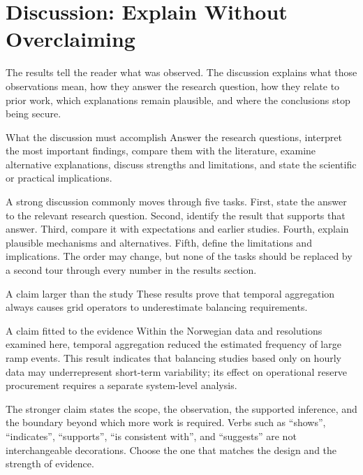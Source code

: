 \documentclass[masters,en,listoffigures,listoftables,acronyms]{NMBU}
\begin{document}
\clearpage
\section{Discussion: Explain Without Overclaiming}
\label{sec:discussion}

The results tell the reader what was observed. The discussion explains what
those observations mean, how they answer the research question, how they relate
to prior work, which explanations remain plausible, and where the conclusions
stop being secure.

\begin{thesispoint}{What the discussion must accomplish}
Answer the research questions, interpret the most important findings, compare
them with the literature, examine alternative explanations, discuss strengths
and limitations, and state the scientific or practical implications.
\end{thesispoint}

A strong discussion commonly moves through five tasks. First, state the answer
to the relevant research question. Second, identify the result that supports
that answer. Third, compare it with expectations and earlier studies. Fourth,
explain plausible mechanisms and alternatives. Fifth, define the limitations
and implications. The order may change, but none of the tasks should be replaced
by a second tour through every number in the results section.

\begin{avoidbox}{A claim larger than the study}
These results prove that temporal aggregation always causes grid operators to
underestimate balancing requirements.
\end{avoidbox}

\begin{betterbox}{A claim fitted to the evidence}
Within the Norwegian data and resolutions examined here, temporal aggregation
reduced the estimated frequency of large ramp events. This result indicates
that balancing studies based only on hourly data may underrepresent short-term
variability; its effect on operational reserve procurement requires a separate
system-level analysis.
\end{betterbox}

The stronger claim states the scope, the observation, the supported inference,
and the boundary beyond which more work is required. Verbs such as ``shows'',
``indicates'', ``supports'', ``is consistent with'', and ``suggests'' are not
interchangeable decorations. Choose the one that matches the design and the
strength of evidence.
\end{document}
